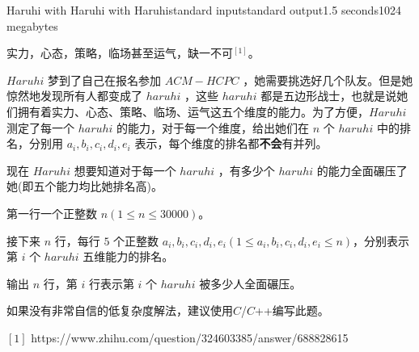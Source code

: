 \begin{problem}{Haruhi with Haruhi with Haruhi}{standard input}{standard output}{1.5 seconds}{1024 megabytes}

实力，心态，策略，临场甚至运气，缺一不可$ ^{[1]}$。

$Haruhi$ 梦到了自己在报名参加 $ACM-HCPC$ ，她需要挑选好几个队友。但是她惊然地发现所有人都变成了 $haruhi$ ，这些 $haruhi$ 都是五边形战士，也就是说她们拥有着实力、心态、策略、临场、运气这五个维度的能力。为了方便，$Haruhi$ 测定了每一个 $haruhi$ 的能力，对于每一个维度，给出她们在 $n$ 个 $ haruhi$ 中的排名，分别用 $a_i,b_i,c_i,d_i,e_i$ 表示，每个维度的排名都\textbf{不会}有并列。

现在 $Haruhi$ 想要知道对于每一个 $haruhi$ ，有多少个 $haruhi$ 的能力全面碾压了她(即五个能力均比她排名高)。

\InputFile

第一行一个正整数 $n(1 \leq n \leq 30000)$。

接下来 $n$ 行，每行 $5$ 个正整数 $a_i,b_i,c_i,d_i,e_i(1 \leq a_i,b_i,c_i,d_i,e_i \leq n)$，分别表示第 $i$ 个 $haruhi$ 五维能力的排名。

\OutputFile

输出 $n$ 行，第 $i$ 行表示第 $i$ 个 $haruhi$ 被多少人全面碾压。

\Example
\begin{example}
%
\end{example}

\Note

如果没有非常自信的低复杂度解法，建议使用$C$/$C$++编写此题。

$[1]$ https://www.zhihu.com/question/324603385/answer/688828615

\end{problem}
